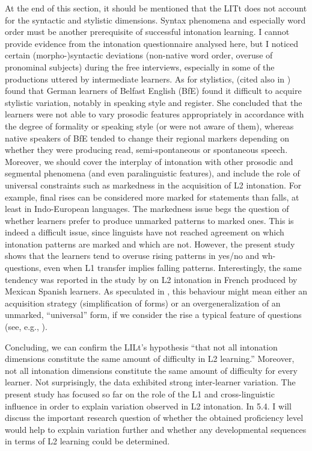 At the end of this section, it should be mentioned that the LITt does not account for the syntactic and stylistic dimensions. Syntax phenomena and especially word order must be another prerequisite of successful intonation learning. I cannot provide evidence from the intonation questionnaire analysed here, but I noticed certain (morpho-)syntactic deviations (non-native word order, overuse of pronominal subjects) during the free interviews, especially in some of the productions uttered by intermediate learners. As for stylistics, \citet{Ulbrich2008} (cited also in \citealt{Mennen2015}) found that German learners of Belfast English (BfE) found it difficult to acquire stylistic variation, notably in speaking style and register. She concluded that the learners were not able to vary prosodic features appropriately in accordance with the degree of formality or speaking style (or were not aware of them), whereas native speakers of BfE tended to change their regional markers depending on whether they were producing read, semi-spontaneous or spontaneous speech. Moreover, we should cover the interplay of intonation with other prosodic and segmental phenomena (and even paralinguistic features), and include the role of universal constraints such as markedness in the acquisition of L2 intonation. For example, final rises can be considered more marked for statements than falls, at least in Indo-European languages. The markedness issue begs the question of whether learners prefer to produce unmarked patterns to marked ones. This is indeed a difficult issue, since linguists have not reached agreement on which intonation patterns are marked and which are not. However, the present study shows that the learners tend to overuse rising patterns in yes/no and wh-questions, even when L1 transfer implies falling patterns. Interestingly, the same tendency was reported in the study by \citet{SantiagoDelais-Roussarie2015b, SantiagoDelais-Roussarie2015a} on L2 intonation in French produced by Mexican Spanish learners. As speculated in , this behaviour might mean either an acquisition strategy (simplification of forms) or an overgeneralization of an unmarked, “universal” form, if we consider the rise a typical feature of questions (see, e.g., \citealt{Bolinger1972b, Cruttenden1997}).



Concluding, we can confirm the LILt’s hypothesis “that not all intonation dimensions constitute the same amount of difficulty in L2 learning.” Moreover, not all intonation dimensions constitute the same amount of difficulty for every learner. Not surprisingly, the data exhibited strong inter-learner variation. The present study has focused so far on the role of the L1 and cross-linguistic influence in order to explain variation observed in L2 intonation. In 5.4. I will discuss the important research question of whether the obtained proficiency level would help to explain variation further and whether any developmental sequences in terms of L2 learning could be determined.



